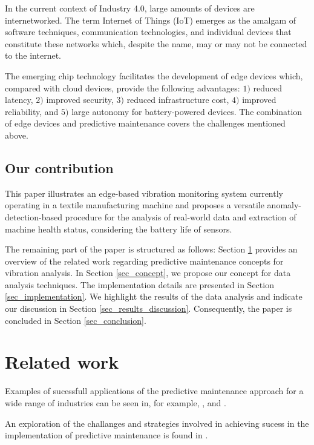 \documentclass[conference]{IEEEtran}
\begin{document}
In the current context of Industry 4.0, large amounts of devices are internetworked. The term Internet of Things (IoT) emerges as the amalgam of software techniques, communication technologies, and individual devices that constitute these networks which, despite the name, may or may not be connected to the internet.

The emerging chip technology facilitates the development of edge devices which, compared with cloud devices, provide the following advantages: $1)$ reduced latency, $2)$ improved security, $3)$ reduced infrastructure cost, $4)$ improved reliability, and $5)$ large autonomy for battery-powered devices. The combination of edge devices and predictive maintenance covers the challenges mentioned above.


\subsection{Our contribution}

This paper illustrates an edge-based vibration monitoring system currently operating in a textile manufacturing machine and proposes a versatile anomaly-detection-based procedure for the analysis of real-world data and extraction of machine health status, considering the battery life of sensors.

The remaining part of the paper is structured as follows: Section \ref{sec_related_work} provides an overview of the related work regarding predictive maintenance concepts for vibration analysis. In Section \ref{sec_concept}, we propose our concept for data analysis techniques. The implementation details are presented in Section \ref{sec_implementation}. We highlight the results of the data analysis and indicate our discussion in Section \ref{sec_results_discussion}. Consequently, the paper is concluded in Section \ref{sec_conclusion}.



\section{Related work}
\label{sec_related_work}

Examples of sucessfull applications of the predictive maintenance approach for a wide range of industries can be seen in, for example, \cite{adebiyi}, \cite{alnajjar} and \cite{doyleek}.

An exploration of the challanges and strategies involved in achieving sucess in the implementation of predictive maintenance is found in \cite{carnero2006evaluation}.
\end{document}
